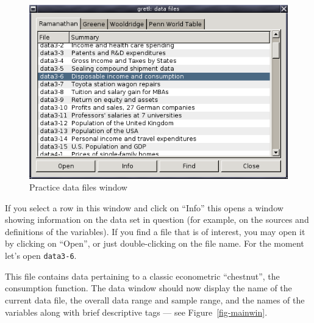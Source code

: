\begin{figure}[htbp]
  \begin{center}
    \includegraphics[scale=0.5]{figures/datafiles}
  \end{center}
  \caption{Practice data files window}
  \label{fig-datafiles}
\end{figure}

If you select a row in this window and click on ``Info'' this opens a
window showing information on the data set in question (for example,
on the sources and definitions of the variables).  If you find a file
that is of interest, you may open it by clicking on ``Open'', or just
double-clicking on the file name. For the moment let's open
\verb+data3-6+.  


This file contains data pertaining to a classic
econometric ``chestnut'', the consumption function.  The data window
should now display the name of the current data file, the overall data
range and sample range, and the names of the variables along with
brief descriptive tags --- see Figure~\ref{fig-mainwin}.
    
